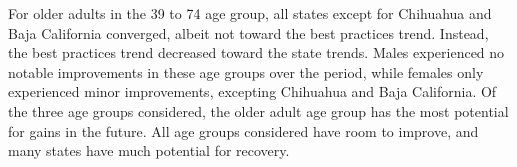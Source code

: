 \documentclass{article}
\begin{document}
For older adults in the 39 to 74 age group, all states except for Chihuahua and
Baja California converged, albeit not toward the best practices trend. Instead,
the best practices trend decreased toward the state trends. Males experienced no
notable improvements in these age groups over the period, while females only
experienced minor improvements, excepting Chihuahua and
Baja California. Of the three age groups considered, the older adult age group
has the most potential for gains in the future. All age groups considered have
room to improve, and many states have much potential for recovery.

%
 
\end{document}
